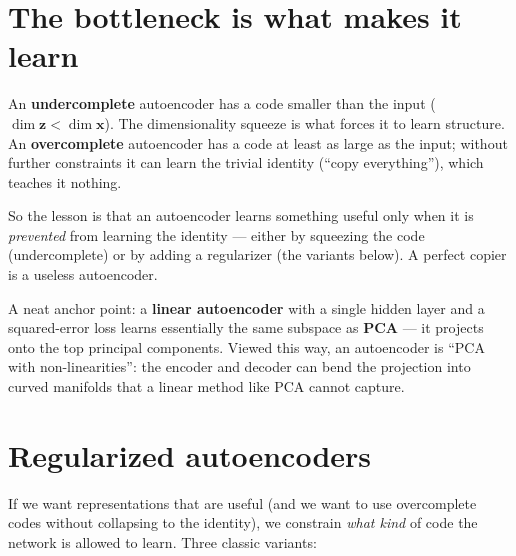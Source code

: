 \documentclass[11pt, oneside]{book}
\newcommand{\xvec}{\mathbf{x}}
\newcommand{\zvec}{\mathbf{z}}
\begin{document}
\section{The bottleneck is what makes it learn}

\begin{defbox}[title={Undercomplete vs.\ overcomplete}]
An \textbf{undercomplete} autoencoder has a code smaller than the input
($\dim\zvec < \dim\xvec$). The dimensionality squeeze is what forces it to learn
structure. An \textbf{overcomplete} autoencoder has a code at least as large as
the input; without further constraints it can learn the trivial identity
(``copy everything''), which teaches it nothing.
\end{defbox}

So the lesson is that an autoencoder learns something useful only when it is
\emph{prevented} from learning the identity --- either by squeezing the code
(undercomplete) or by adding a regularizer (the variants below). A perfect
copier is a useless autoencoder.

\begin{intbox}
A neat anchor point: a \textbf{linear autoencoder} with a single hidden layer and
a squared-error loss learns essentially the same subspace as \textbf{PCA} --- it
projects onto the top principal components. Viewed this way, an autoencoder is
``PCA with non-linearities'': the encoder and decoder can bend the projection
into curved manifolds that a linear method like PCA cannot capture.
\end{intbox}

\section{Regularized autoencoders}

If we want representations that are useful (and we want to use overcomplete codes
without collapsing to the identity), we constrain \emph{what kind} of code the
network is allowed to learn. Three classic variants:
\end{document}
